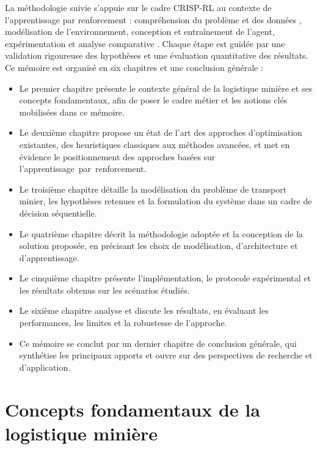 \documentclass[11pt,a4paper]{report}
\begin{document}
La méthodologie suivie s'appuie sur le cadre CRISP-RL au contexte de l'apprentissage par renforcement : compréhension du problème et des données \cite{AlexandraMNewman2010}, modélisation de l'environnement, conception et entraînement de l'agent, expérimentation et analyse comparative \cite{MohammadrezaNazari2018, Szatmári2025}. Chaque étape est guidée par une validation rigoureuse des hypothèses et une évaluation quantitative des résultats. Ce mémoire est organisé en six chapitres et une conclusion générale :
\begin{itemize}
    \item Le premier chapitre présente le contexte général de la logistique minière et ses concepts fondamentaux, afin de poser le cadre métier et les notions clés mobilisées dans ce mémoire.
    \item Le deuxième chapitre propose un état de l’art des approches d’optimisation existantes, des heuristiques classiques aux méthodes avancées, et met en évidence le positionnement des approches basées sur l'\mbox{apprentissage par renforcement}.
    \item Le troisième chapitre détaille la modélisation du problème de transport minier, les hypothèses retenues et la formulation du système dans un cadre de décision séquentielle.
    \item Le quatrième chapitre décrit la méthodologie adoptée et la conception de la solution proposée, en précisant les choix de modélisation, d’architecture et d’apprentissage.
    \item Le cinquième chapitre présente l’implémentation, le protocole expérimental et les résultats obtenus sur les scénarios étudiés.
    \item Le sixième chapitre analyse et discute les résultats, en évaluant les performances, les limites et la robustesse de l’approche.
    \item Ce mémoire se conclut par un dernier chapitre de conclusion générale, qui synthétise les principaux apports et ouvre sur des perspectives de recherche et d’application.
\end{itemize}

\newpage

\chapter{Concepts fondamentaux de la logistique minière}
\label{chap:contexte}
\end{document}
